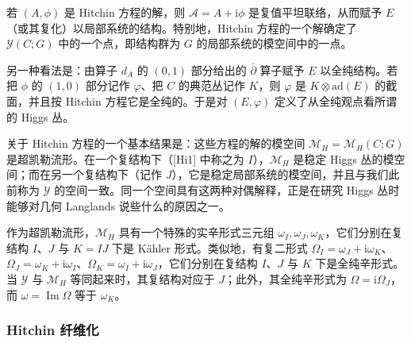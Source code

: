 \documentclass[11pt,a4paper]{article}
\newcommand{\ii}{\mathrm{i}}
\begin{document}
若 $(A,\phi)$ 是 Hitchin 方程的解，则 $\mathcal{A}=A+\ii\phi$ 是复值平坦联络，从而赋予 $E$（或其复化）以局部系统的结构。特别地，Hitchin 方程的一个解确定了 $\mathcal{Y}(C;G)$ 中的一个点，即结构群为 $G$ 的局部系统的模空间中的一点。

另一种看法是：由算子 $d_A$ 的 $(0,1)$ 部分给出的 $\bar\partial$ 算子赋予 $E$ 以全纯结构。若把 $\phi$ 的 $(1,0)$ 部分记作 $\varphi$、把 $C$ 的典范丛记作 $K$，则 $\varphi$ 是 $K\otimes\mathrm{ad}(E)$ 的截面，并且按 Hitchin 方程它是全纯的。于是对 $(E,\varphi)$ 定义了从全纯观点看所谓的 Higgs 丛。

关于 Hitchin 方程的一个基本结果是：这些方程的解的模空间 $\mathcal{M}_H=\mathcal{M}_H(C;G)$ 是超凯勒流形。在一个复结构下（[Hi1] 中称之为 $I$），$\mathcal{M}_H$ 是稳定 Higgs 丛的模空间；而在另一个复结构下（记作 $J$），它是稳定局部系统的模空间，并且与我们此前称为 $\mathcal{Y}$ 的空间一致。同一个空间具有这两种对偶解释，正是在研究 Higgs 丛时能够对几何 Langlands 说些什么的原因之一。

作为超凯勒流形，$\mathcal{M}_H$ 具有一个特殊的实辛形式三元组 $\omega_I,\omega_J,\omega_K$，它们分别在复结构 $I$、$J$ 与 $K=IJ$ 下是 Kähler 形式。类似地，有复二形式 $\Omega_I=\omega_J+\ii\omega_K$、$\Omega_J=\omega_K+\ii\omega_I$、$\Omega_K=\omega_I+\ii\omega_J$，它们分别在复结构 $I$、$J$ 与 $K$ 下是全纯辛形式。当 $\mathcal{Y}$ 与 $\mathcal{M}_H$ 等同起来时，其复结构对应于 $J$；此外，其全纯辛形式为 $\Omega=\ii\Omega_J$，而 $\omega=\operatorname{Im}\Omega$ 等于 $\omega_K$。

\subsubsection{Hitchin 纤维化}
\end{document}
